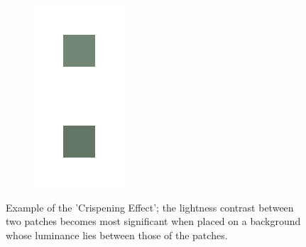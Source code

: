 \documentclass[journal,onecolumn]{IEEEtran}
\begin{document}
\begin{figure}[!htbp]
\begin{subfigure}[b]{0.2\textwidth}
                \includegraphics[width=.85\linewidth, frame]{test-crisp-3}
                \caption{}
                \label{img:crispening-effect-c}
        \end{subfigure}
        \caption{Example of the 'Crispening Effect'; the lightness contrast between two patches becomes most significant when placed on a background whose luminance lies between those of the patches.}
\end{figure}
\end{document}
